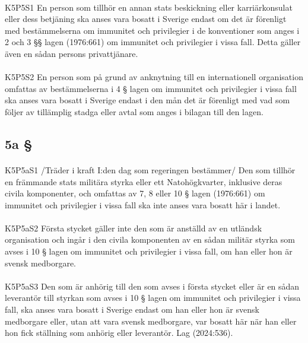 \documentclass[a4paper,notitlepage,openany,10pt]{book}
\begin{document}
\paragraph*{}
{\tiny K5P5S1}
En person som tillhör en annan stats beskickning eller karriärkonsulat eller dess betjäning ska anses vara bosatt i Sverige endast om det är förenligt med bestämmelserna om immunitet och privilegier i de konventioner som anges i 2 och 3 §§ lagen (1976:661) om immunitet och privilegier i vissa fall. Detta gäller även en sådan persons privattjänare.
\paragraph*{}
{\tiny K5P5S2}
En person som på grund av anknytning till en internationell organisation omfattas av bestämmelserna i 4 § lagen om immunitet och privilegier i vissa fall ska anses vara bosatt i Sverige endast i den mån det är förenligt med vad som följer av tillämplig stadga eller avtal som anges i bilagan till den lagen.
\subsection*{5a §}
\paragraph*{}
{\tiny K5P5aS1}
/Träder i kraft I:den dag som regeringen bestämmer/
Den som tillhör en främmande stats militära styrka eller ett Natohögkvarter, inklusive deras civila komponenter, och omfattas av 7, 8 eller 10 § lagen (1976:661) om immunitet och privilegier i vissa fall ska inte anses vara bosatt här i landet.
\paragraph*{}
{\tiny K5P5aS2}
Första stycket gäller inte den som är anställd av en utländsk organisation och ingår i den civila komponenten av en sådan militär styrka som avses i 10 § lagen om immunitet och privilegier i vissa fall, om han eller hon är svensk medborgare.
\paragraph*{}
{\tiny K5P5aS3}
Den som är anhörig till den som avses i första stycket eller är en sådan leverantör till styrkan som avses i 10 § lagen om immunitet och privilegier i vissa fall, ska anses vara bosatt i Sverige endast om han eller hon är svensk medborgare eller, utan att vara svensk medborgare, var bosatt här när han eller hon fick ställning som anhörig eller leverantör.
Lag (2024:536).
\end{document}
